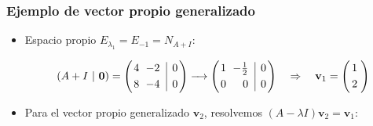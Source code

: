 \begin{frame}\frametitle{Ejemplo de vector propio generalizado}
	
	\begin{itemize}
		\item Espacio propio $E_{\lambda_1}=E_{-1}=N_{A+I}$:
		
		\[				
		(A+I \ | \ \mathbf{0})
		=
		\left(
		\begin{array}{@{\hspace{0.2\tabcolsep}}r@{\hspace{\tabcolsep}}r@{\hspace{\tabcolsep}}|r@{\hspace{0.2\tabcolsep}}}
		4 & -2 & 0  \\[1mm]
		8 & -4 & 0
		\end{array}
		\right) 
		\xrightarrow[]{\phantom{xx} }		
		\left(
		\begin{array}{@{\hspace{0.2\tabcolsep}}r@{\hspace{\tabcolsep}}r@{\hspace{\tabcolsep}}|r@{\hspace{0.2\tabcolsep}}}
		1 & -\frac{1}{2} & 0  \\[1mm]
		0 &    0 & 0
		\end{array}
		\right) 
		\quad \Rightarrow \quad 
		\mathbf{v}_1 = 
		\left(
		\begin{array}{@{\hspace{0.3\tabcolsep}}c@{\hspace{0.5\tabcolsep}}}
		1   \\[1mm]
		2 
		\end{array}
		\right) 
		\]
		
		\vspace{8mm}
		\item  Para el vector propio generalizado $\mathbf{v}_2$, resolvemos $(A-\lambda I)\mathbf{v}_2= \mathbf{v}_1$:
		

\end{itemize}
\end{frame}
